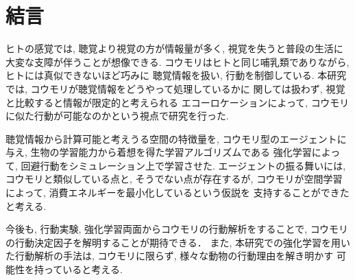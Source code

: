 \documentclass[../main]{subfiles}
\begin{document}
\newpage
\chapter*{結言}
\label{chap:summary}
ヒトの感覚では, 聴覚より視覚の方が情報量が多く, 
視覚を失うと普段の生活に大変な支障が伴うことが想像できる.
コウモリはヒトと同じ哺乳類でありながら, 
ヒトには真似できないほど巧みに
聴覚情報を扱い, 行動を制御している.
本研究では, コウモリが聴覚情報をどうやって処理しているかに
関しては扱わず, 
視覚と比較すると情報が限定的と考えられる
エコーロケーションによって,
コウモリに似た行動が可能なのかという視点で研究を行った.

聴覚情報から計算可能と考えうる空間の特徴量を, 
コウモリ型のエージェントに与え, 
生物の学習能力から着想を得た学習アルゴリズムである 
強化学習によって, 回避行動をシミュレーション上で学習させた.
エージェントの振る舞いには, 
コウモリと類似している点と, そうでない点が存在するが, 
コウモリが空間学習によって, 
消費エネルギーを最小化しているという仮説を
支持することができたと考える.

今後も, 行動実験, 強化学習両面からコウモリの行動解析をすることで, 
コウモリの行動決定因子を解明することが期待できる．
また, 本研究での強化学習を用いた行動解析の手法は, 
コウモリに限らず, 様々な動物の行動理由を解き明かす
可能性を持っていると考える.
\end{document}
